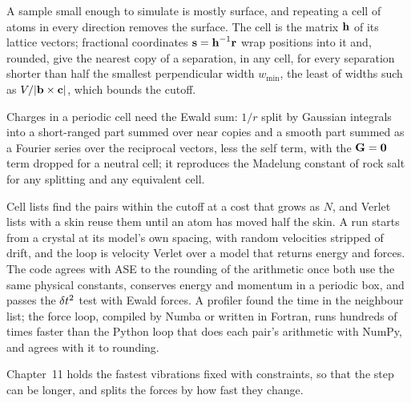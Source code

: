 
A sample small enough to simulate is mostly surface, and repeating a cell
of atoms in every direction removes the surface. The cell is the matrix
$\bm{\mathrm{h}}$ of its lattice vectors; fractional coordinates $\bm{\mathrm{s}} =
\bm{\mathrm{h}}^{-1}\bm{\mathrm{r}}$ wrap positions into it and, rounded, give the nearest
copy of a separation, in any cell, for every separation shorter than half
the smallest perpendicular width $w_{\min}$, the least of widths such as
$V/\lvert\bm{\mathrm{b}}\times\bm{\mathrm{c}}\rvert$, which bounds the cutoff.

Charges in a periodic cell need the Ewald sum: $1/r$
split by Gaussian integrals into a short-ranged part summed over near
copies and a smooth part summed as a Fourier series over the reciprocal
vectors, less the self term, with the $\bm{\mathrm{G}} = \bm{\mathrm{0}}$ term dropped for
a neutral cell; it reproduces the Madelung constant of rock salt for any
splitting and any equivalent cell.

Cell lists find the pairs within the
cutoff at a cost that grows as $N$, and Verlet lists with a skin reuse
them until an atom has moved half the skin. A run starts from a crystal
at its model's own spacing, with random velocities stripped of drift, and
the loop is velocity Verlet over a model that returns energy and forces.
The code agrees with ASE to the rounding of the arithmetic once both use
the same physical constants, conserves energy and momentum in a periodic
box, and passes the $\delta t^2$ test with Ewald forces. A profiler found the
time in the neighbour list; the force loop, compiled by Numba or written
in Fortran, runs hundreds of times faster than the Python loop that does
each pair's arithmetic with NumPy, and agrees with it to rounding.

Chapter~11 holds the fastest vibrations fixed with constraints, so that
the step can be longer, and splits the forces by how fast they change.
